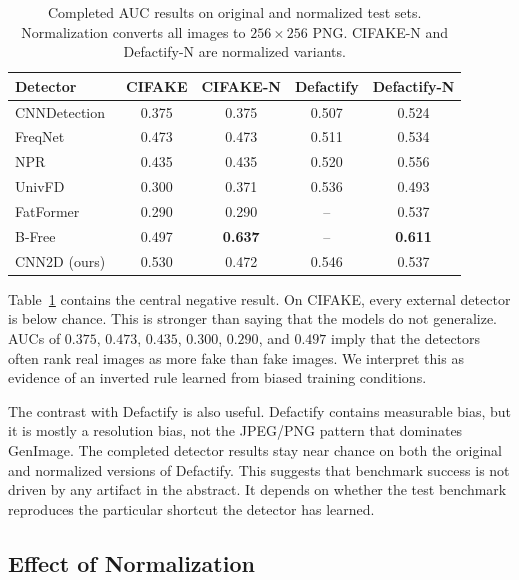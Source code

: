 \documentclass{article}
\begin{document}
\begin{table}[t]
\centering
\small
\setlength{\tabcolsep}{4pt}
\begin{tabular}{lcccc}
\toprule
\textbf{Detector} & \textbf{CIFAKE} & \textbf{CIFAKE-N} & \textbf{Defactify} & \textbf{Defactify-N} \\
\midrule
CNNDetection~\cite{wang2020cnn} & 0.375 & 0.375 & 0.507 & 0.524 \\
FreqNet~\cite{freqnet}          & 0.473 & 0.473 & 0.511 & 0.534 \\
NPR~\cite{npr}                  & 0.435 & 0.435 & 0.520 & 0.556 \\
UnivFD~\cite{univfd}            & 0.300 & 0.371 & 0.536 & 0.493 \\
FatFormer~\cite{fatformer}      & 0.290 & 0.290 & --    & 0.537 \\
B-Free~\cite{bfree}             & 0.497 & \textbf{0.637} & -- & \textbf{0.611} \\
CNN2D (ours)                    & 0.530 & 0.472 & 0.546 & 0.537 \\
\bottomrule
\end{tabular}
\caption{Completed AUC results on original and normalized test sets. Normalization converts all images to $256\times256$ PNG. CIFAKE-N and Defactify-N are normalized variants.}
\label{tab:perf}
\end{table}

Table~\ref{tab:perf} contains the central negative result.
On CIFAKE, every external detector is below chance.
This is stronger than saying that the models do not generalize.
AUCs of $0.375$, $0.473$, $0.435$, $0.300$, $0.290$, and $0.497$ imply that the detectors often rank real images as more fake than fake images.
We interpret this as evidence of an inverted rule learned from biased training conditions.

The contrast with Defactify is also useful.
Defactify contains measurable bias, but it is mostly a resolution bias, not the JPEG/PNG pattern that dominates GenImage.
The completed detector results stay near chance on both the original and normalized versions of Defactify.
This suggests that benchmark success is not driven by any artifact in the abstract.
It depends on whether the test benchmark reproduces the particular shortcut the detector has learned.

\subsection{Effect of Normalization}
\end{document}
